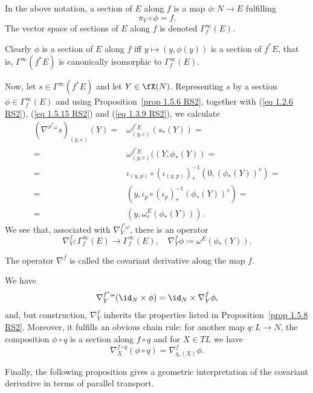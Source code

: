 \begin{defn}
    In the above notation, a section of $E$ along $f$ is a map $\phi:N\to E$ fulfilling 
    \[\pi_V\circ \phi=f.\]
    The vector space of sections of $E$ along $f$ is denoted $\Gamma_f^\infty(E)$.
\end{defn}

Clearly $\phi$ is a section of $E$ along $f$ iff $y\mapsto (y,\phi(y))$ is a section of $f^\ast E$, that is, $\Gamma^\infty(f^\ast E)$ is canonically isomorphic to $\Gamma^\infty_f(E)$.

Now, let $s\in\Gamma^\infty(f^\ast E)$ and let $Y\in\fX(N)$. Representing $s$ by a section $\phi\in \Gamma^\infty_f(E)$ and using Proposition~\ref{prop 1.5.6 RS2}, together with (\ref{eq 1.2.6 RS2}), (\ref{eq 1.5.15 RS2}) and (\ref{eq 1.3.9 RS2}), we calculate
\begin{align}
    (\nabla^{\vartheta^\ast\omega}s)_{(y,e)}(Y)=&\omega^{f^\ast E}_{(y,e)}(s_\ast(Y))=\\
    =&\omega^{f^\ast E}_{(y,e)}((Y,\phi_\ast(Y))=\\
    =&\iota_{(y,p)}\circ (\iota_{(y,p)})_\ast^{-1}(0,(\phi_\ast(Y))^v)=\\
    =&(y,\iota_p\circ (\iota_p)_\ast^{-1}(\phi_\ast(Y))^v)=\\
    =&(y,\omega^E_e(\phi_\ast(Y))).
\end{align}
We see that, associated with $\nabla^{f^\ast\omega}_Y$, there is an operator
\[\nabla^f_Y:\Gamma^\infty_f(E)\to \Gamma^\infty_f(E),\quad \nabla^f_Y \phi\coloneqq \omega^E(\phi_\ast(Y)).\label{eq 1.5.16 RS2}\]

\begin{defn}
    The operator $\nabla^f$ is called the covariant derivative along the map $f$.
\end{defn}

We have
\[\nabla_Y^{f^\ast\omega}(\id_N\times \phi)=\id_N\times \nabla^f_Y \phi,\]
and, but construction, $\nabla^f_Y$ inherits the properties listed in Proposition~\ref{prop 1.5.8 RS2}. Moreover, it fulfills an obvious chain rule: for another map $q:L\to N$, the composition $\phi\circ q$ is a section along $f\circ q$ and for $X\in TL$ we have
\[\nabla_X^{f\circ q}(\phi\circ q)=\nabla^f_{q_\ast(X)}\phi.\]


Finally, the following proposition gives a geometric interpretation of the covariant derivative in terms of parallel transport.
  

